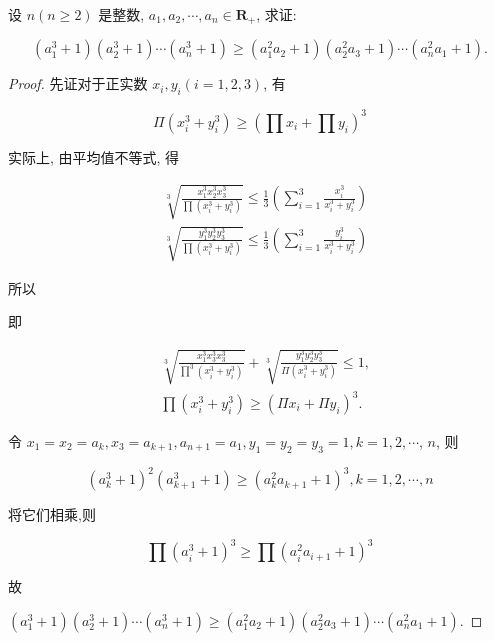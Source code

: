 \begin{example}
	设 $n(n \geqslant 2)$ 是整数, $a_{1}, a_{2}, \cdots, a_{n} \in \mathbf{R}_{+}$, 求证:
	
	$$
	\left(a_{1}^{3}+1\right)\left(a_{2}^{3}+1\right) \cdots\left(a_{n}^{3}+1\right) \geqslant\left(a_{1}^{2} a_{2}+1\right)\left(a_{2}^{2} a_{3}+1\right) \cdots\left(a_{n}^{2} a_{1}+1\right) .
	$$
\end{example}
\begin{proof}
	先证对于正实数 $x_{i}, y_{i}(i=1,2,3)$, 有
	
	$$
	\Pi\left(x_{i}^{3}+y_{i}^{3}\right) \geqslant\left(\prod x_{i}+\prod y_{i}\right)^{3}
	$$
	
	实际上, 由平均值不等式, 得
	
	$$
	\begin{aligned}
	& \sqrt[3]{\frac{x_{1}^{3} x_{2}^{3} x_{3}^{3}}{\prod\left(x_{i}^{3}+y_{i}^{3}\right)}} \leqslant \frac{1}{3}\left(\sum_{i=1}^{3} \frac{x_{i}^{3}}{x_{i}^{3}+y_{i}^{3}}\right) \\
	& \sqrt[3]{\frac{y_{1}^{3} y_{2}^{3} y_{3}^{3}}{\prod\left(x_{i}^{3}+y_{i}^{3}\right)}} \leqslant \frac{1}{3}\left(\sum_{i=1}^{3} \frac{y_{i}^{3}}{x_{i}^{3}+y_{i}^{3}}\right)
	\end{aligned}
	$$
	
	所以
	
	即
	
	$$
	\begin{aligned}
	& \sqrt[3]{\frac{x_{1}^{3} x_{3}^{3} x_{3}^{3}}{\prod^{3}\left(x_{i}^{3}+y_{i}^{3}\right)}}+\sqrt[3]{\frac{y_{1}^{3} y_{2}^{3} y_{3}^{3}}{\Pi\left(x_{i}^{3}+y_{i}^{3}\right)}} \leqslant 1, \\
	& \prod\left(x_{i}^{3}+y_{i}^{3}\right) \geqslant\left(\Pi x_{i}+\Pi y_{i}\right)^{3} .
	\end{aligned}
	$$
	
	令 $x_{1}=x_{2}=a_{k}, x_{3}=a_{k+1}, a_{n+1}=a_{1}, y_{1}=y_{2}=y_{3}=1, k=1,2, \cdots$, $n$, 则
	
	$$
	\left(a_{k}^{3}+1\right)^{2}\left(a_{k+1}^{3}+1\right) \geqslant\left(a_{k}^{2} a_{k+1}+1\right)^{3}, k=1,2, \cdots, n
	$$
	
	将它们相乘,则
	
	$$
	\prod\left(a_{i}^{3}+1\right)^{3} \geqslant \prod\left(a_{i}^{2} a_{i+1}+1\right)^{3}
	$$
	
	故
	
	$\left(a_{1}^{3}+1\right)\left(a_{2}^{3}+1\right) \cdots\left(a_{n}^{3}+1\right) \geqslant\left(a_{1}^{2} a_{2}+1\right)\left(a_{2}^{2} a_{3}+1\right) \cdots\left(a_{n}^{2} a_{1}+1\right)$.
\end{proof}
